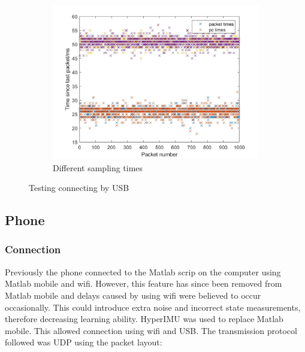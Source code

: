 \documentclass[twoside,twocolumn,12pt]{article}
\begin{document}
\begin{figure}[hb!]
\begin{subfigure}[t]{0.325\textwidth}
    \includegraphics[width=\linewidth]{both}
    \caption{Different sampling times}
  \label{fig:ts2}
  \end{subfigure}
  \caption{Testing connecting by USB}
  \label{fig:usb}
\end{figure}
\subsection{Phone}
\subsubsection{Connection}
Previously the phone connected to the Matlab scrip on the computer using Matlab mobile and wifi. However, this feature has since been removed from Matlab mobile and delays caused by using wifi were believed to occur occasionally. This could introduce extra noise and incorrect state measurements, therefore decreasing learning ability.
\newline
HyperIMU \cite{ianovir} was used to replace Matlab mobile. This allowed connection using wifi and USB. The transmission protocol followed was UDP using the packet layout:



\begin{align*}
[t, a_x, a_y ,a_z , \dot{\alpha}_x, \dot{\alpha}_y , \dot{\alpha}_z \#]
\end{align*}
\end{document}
